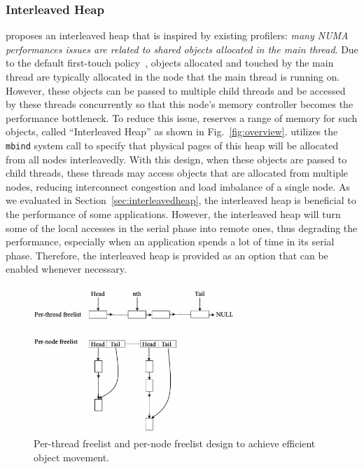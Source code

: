 \subsubsection{Interleaved Heap} 
\NA{} proposes an interleaved heap that is inspired by existing profilers\cite{XuNuma, MemProf}: \textit{many NUMA performances issues are related to shared objects allocated in the main thread}. Due to the default first-touch policy~\cite{lameter2013numa, diener2015locality}, objects allocated and touched by the main thread are typically allocated in the node that the main thread is running on. However, these objects can be passed to multiple child threads and be accessed by these threads concurrently so that this node's memory controller becomes the performance bottleneck. 
To reduce this issue, \NA{} reserves a range of memory for such objects, called ``Interleaved Heap'' as shown in Fig.~\ref{fig:overview}. \NA{} utilizes the \texttt{mbind} system call to specify that physical pages of this heap will be allocated from all nodes interleavedly. With this design, when these objects are passed to child threads, these threads may access objects that are allocated from multiple nodes, reducing interconnect congestion and load imbalance of a single node. 
As we evaluated in Section~\ref{sec:interleavedheap}, the interleaved heap is beneficial to the performance of some applications. However, the interleaved heap will turn some of the local accesses in the serial phase into remote ones, thus degrading the performance, especially when an application spends a lot of time in its serial phase. Therefore, the interleaved heap is provided as an option that can be enabled whenever necessary. 

\begin{figure}[!h]
\centering
\includegraphics[width=3in]{SC2022/figure/efficient-movement.png}
\caption{Per-thread freelist and per-node freelist design to achieve efficient object movement.\label{fig:perthreadlist}}
\end{figure}

